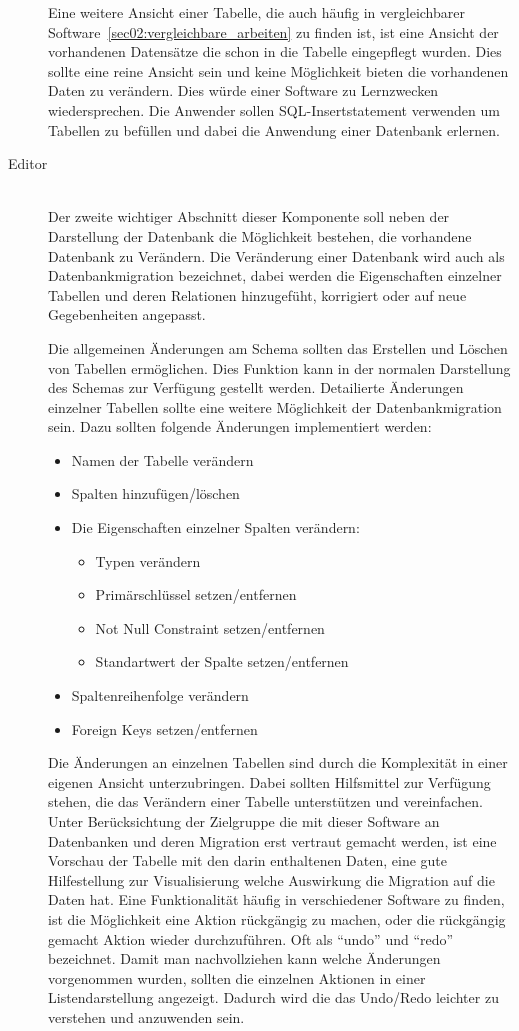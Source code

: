 \begin{description}
Eine weitere Ansicht einer Tabelle, die auch häufig in vergleichbarer Software~\ref{sec02:vergleichbare_arbeiten} zu finden ist, ist eine Ansicht der vorhandenen Datensätze die schon in die Tabelle eingepflegt wurden. Dies sollte eine reine Ansicht sein und keine Möglichkeit bieten die vorhandenen Daten zu verändern. Dies würde einer Software zu Lernzwecken wiedersprechen. Die Anwender sollen SQL-Insertstatement verwenden um Tabellen zu befüllen und dabei die Anwendung einer Datenbank erlernen.

\item[Editor] \hfill\\
Der zweite wichtiger Abschnitt dieser Komponente soll neben der Darstellung der Datenbank die Möglichkeit bestehen, die vorhandene Datenbank zu Verändern.
Die Veränderung einer Datenbank wird auch als Datenbankmigration bezeichnet, dabei werden die Eigenschaften einzelner Tabellen und deren Relationen hinzugefüht, korrigiert oder auf neue Gegebenheiten angepasst.

Die allgemeinen Änderungen am Schema sollten das Erstellen und Löschen von Tabellen ermöglichen.
Dies Funktion kann in der normalen Darstellung des Schemas zur Verfügung gestellt werden. Detailierte Änderungen einzelner Tabellen sollte eine weitere Möglichkeit der Datenbankmigration sein. Dazu sollten folgende Änderungen implementiert werden:
\begin{itemize}
\item Namen der Tabelle verändern
\item Spalten hinzufügen/löschen
\item Die Eigenschaften einzelner Spalten verändern:
    \begin{itemize}
    \item Typen verändern
    \item Primärschlüssel setzen/entfernen
    \item Not Null Constraint setzen/entfernen
    \item Standartwert der Spalte setzen/entfernen
    \end{itemize}
\item Spaltenreihenfolge verändern
\item Foreign Keys setzen/entfernen
\end{itemize}

Die Änderungen an einzelnen Tabellen sind durch die Komplexität in einer eigenen Ansicht unterzubringen. Dabei sollten Hilfsmittel zur Verfügung stehen, die das Verändern einer Tabelle unterstützen und vereinfachen.
Unter Berücksichtung der Zielgruppe die mit dieser Software an Datenbanken und deren Migration erst vertraut gemacht werden, ist eine Vorschau der Tabelle mit den darin enthaltenen Daten, eine gute Hilfestellung zur Visualisierung welche Auswirkung die Migration auf die Daten hat.
Eine Funktionalität häufig in verschiedener Software zu finden, ist die Möglichkeit eine Aktion rückgängig zu machen, oder die rückgängig gemacht Aktion wieder durchzuführen. Oft als ``undo'' und ``redo'' bezeichnet. Damit man nachvollziehen kann welche Änderungen vorgenommen wurden, sollten die einzelnen Aktionen in einer Listendarstellung angezeigt. Dadurch wird die das Undo/Redo leichter zu verstehen und anzuwenden sein.


\end{description}
